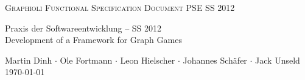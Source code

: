 \begin{titlepage}
\begin{center}
\fontsize{40}{50}\selectfont
        \vfill
        \textsc{Graphioli}
		\vfill
        \textsc{Functional Specification Document}
        \vfill
\LARGE
PSE SS 2012
  \vfill
 \newpage
 
 \null
 \vfill
 
 Praxis der Softwareentwicklung -- SS 2012 \\
 
  \Large
  Development of a Framework for Graph Games \\
  \medskip
  \vspace{2cm}
  
    Martin Dinh $\cdot$ Ole Fortmann $\cdot$ Leon Hielscher $\cdot$ Johannes Schäfer $\cdot$ Jack Unseld
  \vspace{2cm} \\
  \today
\end{center}

  \vfill

\end{titlepage}